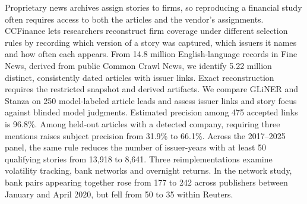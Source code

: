 Proprietary news archives assign stories to firms, so reproducing a
financial study often requires access to both the articles and the
vendor's assignments. CCFinance lets researchers reconstruct firm coverage
under different selection rules by recording which version of a story
was captured, which issuers it names and how often each appears. From
14.8 million
English-language records in Fine News, derived from public Common Crawl
News, we identify 5.22 million distinct, consistently dated articles
with issuer links. Exact reconstruction requires the restricted snapshot
and derived artifacts. We compare GLiNER and Stanza on 250 model-labeled
article leads and assess issuer links and story focus against blinded
model judgments. Estimated precision among 475 accepted links is 96.8\%.
Among held-out articles with a detected company, requiring three
mentions raises subject precision from 31.9\% to 66.1\%. Across the
2017--2025 panel, the same rule reduces the number of issuer-years with
at least 50 qualifying stories from 13,918 to 8,641. Three
reimplementations examine
volatility tracking, bank networks and overnight returns. In the network
study, bank pairs appearing together rose from 177 to 242 across
publishers between January and April 2020, but fell from 50 to 35
within Reuters.

